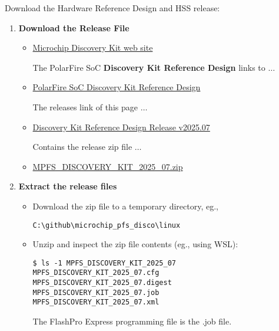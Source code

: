 Download the Hardware Reference Design and HSS release:
%
\begin{enumerate}
\item \textbf{Download the Release File}
%
\begin{itemize}
\item
\href{https://www.microchip.com/en-us/development-tool/mpfs-disco-kit}
{Microchip Discovery Kit web site}

The PolarFire SoC \textbf{Discovery Kit Reference Design} links to $\dots$

\item
\href{https://github.com/polarfire-soc/polarfire-soc-discovery-kit-reference-design}
{PolarFire SoC Discovery Kit Reference Design}

The releases link of this page $\dots$

\item
\href{https://github.com/polarfire-soc/polarfire-soc-discovery-kit-reference-design/releases/tag/v2025.07}
{Discovery Kit Reference Design Release v2025.07}

Contains the release zip file $\dots$

\item
\href{https://github.com/polarfire-soc/polarfire-soc-discovery-kit-reference-design/releases/download/v2025.07/MPFS_DISCOVERY_KIT_2025_07.zip}
{MPFS\_DISCOVERY\_KIT\_2025\_07.zip}
\end{itemize}

\item \textbf{Extract the release files}
%
\begin{itemize}
\item Download the zip file to a temporary directory, eg.,

\begin{verbatim}
C:\github\microchip_pfs_disco\linux
\end{verbatim}

\item Unzip and inspect the zip file contents (eg., using WSL):

\begin{verbatim}
$ ls -1 MPFS_DISCOVERY_KIT_2025_07
MPFS_DISCOVERY_KIT_2025_07.cfg
MPFS_DISCOVERY_KIT_2025_07.digest
MPFS_DISCOVERY_KIT_2025_07.job
MPFS_DISCOVERY_KIT_2025_07.xml
\end{verbatim}
The FlashPro Express programming file is the .job file.


\end{itemize}
\end{enumerate}
